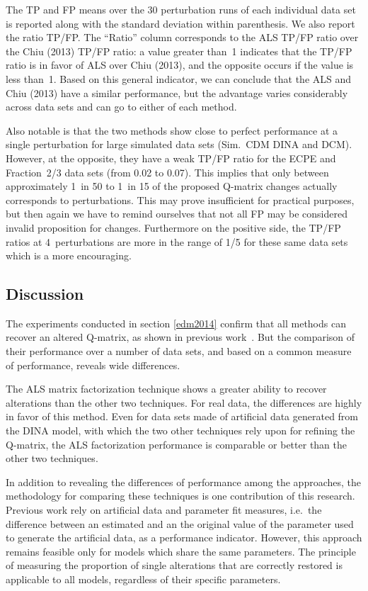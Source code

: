 The TP and FP means over the 30 perturbation runs of each individual data set is reported along with
the standard deviation within parenthesis.  We also report the ratio TP/FP. The ``Ratio'' column corresponds to the ALS TP/FP
ratio over the Chiu (2013) TP/FP ratio: a value greater than~1 indicates that the TP/FP ratio is in favor of ALS over Chiu (2013), and
the opposite occurs if the value is less than~1.  Based on this general indicator, we can conclude that the ALS and Chiu (2013) have a
similar performance, but the advantage varies considerably across data sets and can go to either of each method.

Also notable is that the two methods show close to perfect performance at a single perturbation for large simulated data sets
(Sim.~CDM DINA and DCM).  However, at the opposite, they have a weak TP/FP ratio for the ECPE and Fraction~2/3 data sets (from
0.02 to 0.07).  This implies that only between approximately 1~in 50 to 1~in 15 of the proposed Q-matrix changes actually
corresponds to perturbations.  This may prove insufficient for practical purposes, but then again we have to remind ourselves
that not all FP may be considered invalid proposition for changes.  Furthermore on the positive side, the TP/FP ratios at
4~perturbations are more in the range of 1/5 for these same data sets which is a more encouraging.


\subsection{Discussion}

The experiments conducted in section \ref{edm2014} confirm that all methods can recover an altered Q-matrix, as shown in previous work~\cite{delaTorre2008,chiu2013statistical,Desmarais2013aied}. But the comparison of their performance over a number of data sets, and based on a common measure of performance, reveals wide differences.

The ALS matrix factorization technique shows a greater ability to recover alterations than the other two techniques.  For real data, the differences are highly in favor of this method.  Even for data sets made of artificial data generated from the DINA model, with which the two other techniques rely upon for refining the Q-matrix, the ALS factorization performance is comparable or better than the other two techniques.

In addition to revealing the differences of performance among the approaches, the methodology for comparing these techniques is one contribution of this research. Previous work rely on artificial data and parameter fit measures, i.e.\ the difference between an estimated and an the original value of the parameter used to generate the artificial data, as a performance indicator.  However, this approach remains feasible only for models which share the same parameters.  The principle of measuring the proportion of single alterations that are correctly restored is applicable to all models, regardless of their specific parameters.  


